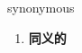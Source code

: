 
\begin{frame}
{\huge synonymous}
\begin{center}
\begin{enumerate}\Large
  \item \textbf{同义的}
\end{enumerate}
\end{center}
\end{frame}
